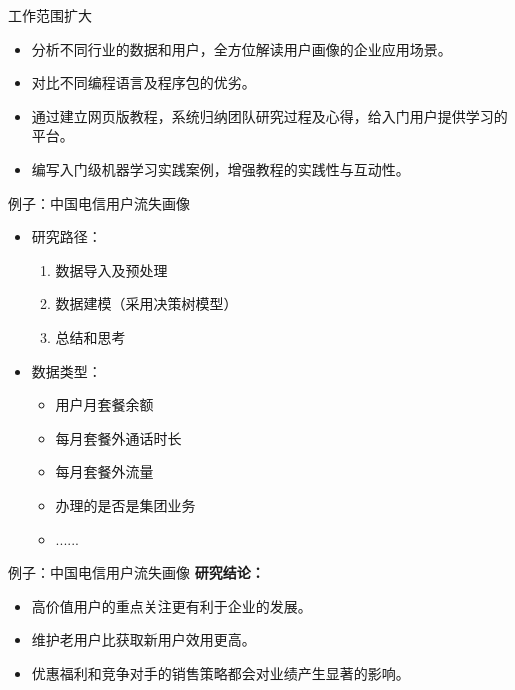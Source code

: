 \documentclass[10pt,aspectratio=32,handout]{beamer}
\begin{document}
\begin{frame}{工作范围扩大}
   \begin{itemize}
      \item 分析不同行业的数据和用户，全方位解读用户画像的企业应用场景。\newline
      \item 对比不同编程语言及程序包的优劣。\newline
      \item 通过建立网页版教程，系统归纳团队研究过程及心得，给入门用户提供学习的平台。\newline
      \item 编写入门级机器学习实践案例，增强教程的实践性与互动性。
   \end{itemize}
\end{frame}

\begin{frame}{例子：中国电信用户流失画像}
\begin{itemize}
\item 研究路径：
  \begin{enumerate}
    \item 数据导入及预处理\newline
    \item 数据建模（采用决策树模型）\newline
    \item 总结和思考\newline
  \end{enumerate}
\item 数据类型：
  \begin{itemize}
    \item 用户月套餐余额\newline
    \item 每月套餐外通话时长\newline
    \item 每月套餐外流量\newline
    \item 办理的是否是集团业务\newline
    \item ......
  \end{itemize}
\end{itemize}
\end{frame}

\begin{frame}{例子：中国电信用户流失画像}
\textbf{研究结论：}\newline
\begin{itemize}
\item 高价值用户的重点关注更有利于企业的发展。\newline
\item 维护老用户比获取新用户效用更高。\newline
\item 优惠福利和竞争对手的销售策略都会对业绩产生显著的影响。\newline
\end{itemize}
\end{frame}
\end{document}
